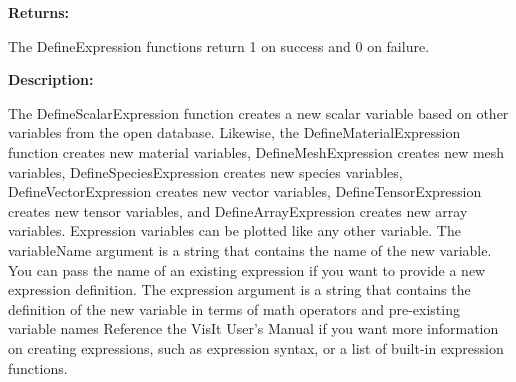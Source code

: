 \documentclass[letterpaper,10pt,english]{sphinxmanual}
\begin{document}
\begin{DUlineblock}{0em}
\item[] 
\item[] \textbf{Returns:}
\item[] The DefineExpression functions return 1 on success and 0 on failure.
\item[] 
\item[] \textbf{Description:}
\item[] The DefineScalarExpression function creates a new scalar variable based on
other variables from the open database. Likewise, the
DefineMaterialExpression function creates new material variables,
DefineMeshExpression creates new mesh variables, DefineSpeciesExpression
creates new species variables, DefineVectorExpression creates new
vector variables, DefineTensorExpression creates new tensor variables, and
DefineArrayExpression creates new array variables.
Expression variables can be plotted like any other variable.
The variableName argument is a string that contains the name of the new
variable. You can pass the name of an existing expression if you want
to provide a new expression definition.
The expression argument is a string that contains the definition of the
new variable in terms of math operators and pre-existing variable names
Reference the VisIt User's Manual if you want more information on
creating expressions, such as expression syntax, or a list of built-in
expression functions.
\end{DUlineblock}

\begin{DUlineblock}{0em}
\item[] 
\end{DUlineblock}
\end{document}
